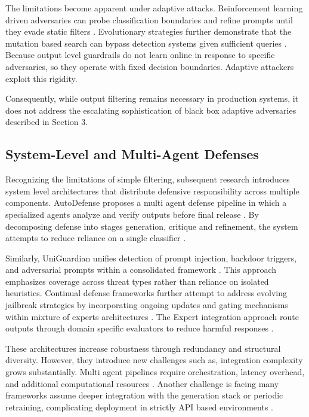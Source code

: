\documentclass[conference]{IEEEtran}
\begin{document}
The limitations become apparent under adaptive attacks. Reinforcement learning driven adversaries can probe classification boundaries and refine prompts until they evade static filters \cite{b14,b16}. Evolutionary strategies further demonstrate that the mutation based search can bypass detection systems given sufficient queries \cite{b13}. Because output level guardrails do not learn online in response to specific adversaries, so they operate with fixed decision boundaries. Adaptive attackers exploit this rigidity.

Consequently, while output filtering remains necessary in production systems, it does not address the escalating sophistication of black box adaptive adversaries described in Section 3.

\subsection{System-Level and Multi-Agent Defenses}

Recognizing the limitations of simple filtering, subsequent research introduces system level architectures that distribute defensive responsibility across multiple components. AutoDefense proposes a multi agent defense pipeline in which a specialized agents analyze and verify outputs before final release \cite{b19}. By decomposing defense into stages generation, critique and refinement, the system attempts to reduce reliance on a single classifier \cite{b19}.

Similarly, UniGuardian unifies detection of prompt injection, backdoor triggers, and adversarial prompts within a consolidated framework \cite{b21}. This approach emphasizes coverage across threat types rather than reliance on isolated heuristics. Continual defense frameworks further attempt to address evolving jailbreak strategies by incorporating ongoing updates and gating mechanisms within mixture of experts architectures \cite{b22}. The Expert integration approach route outputs through domain specific evaluators to reduce harmful responses \cite{b20}.

These architectures increase robustness through redundancy and structural diversity. However, they introduce new challenges such as, integration complexity grows substantially. Multi agent pipelines require orchestration, latency overhead, and additional computational resources \cite{b19,b22}.  Another challenge is facing many frameworks assume deeper integration with the generation stack or periodic retraining, complicating deployment in strictly API based environments \cite{b21,b22}.
\end{document}
